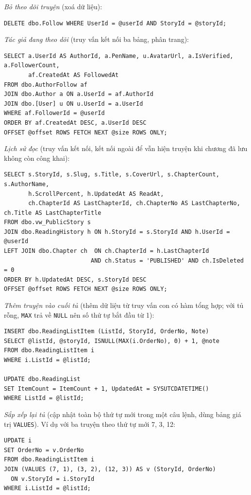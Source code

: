 \textit{Bỏ theo dõi truyện} (xoá dữ liệu):
\begin{verbatim}
DELETE dbo.Follow WHERE UserId = @userId AND StoryId = @storyId;
\end{verbatim}

\textit{Tác giả đang theo dõi} (truy vấn kết nối ba bảng, phân trang):
\begin{verbatim}
SELECT a.UserId AS AuthorId, a.PenName, u.AvatarUrl, a.IsVerified, a.FollowerCount,
       af.CreatedAt AS FollowedAt
FROM dbo.AuthorFollow af
JOIN dbo.Author a ON a.UserId = af.AuthorId
JOIN dbo.[User] u ON u.UserId = a.UserId
WHERE af.FollowerId = @userId
ORDER BY af.CreatedAt DESC, a.UserId DESC
OFFSET @offset ROWS FETCH NEXT @size ROWS ONLY;
\end{verbatim}

\textit{Lịch sử đọc} (truy vấn kết nối, kết nối ngoài để vẫn hiện truyện khi chương đã lưu không còn công khai):
\begin{verbatim}
SELECT s.StoryId, s.Slug, s.Title, s.CoverUrl, s.ChapterCount, s.AuthorName,
       h.ScrollPercent, h.UpdatedAt AS ReadAt,
       ch.ChapterId AS LastChapterId, ch.ChapterNo AS LastChapterNo, ch.Title AS LastChapterTitle
FROM dbo.vw_PublicStory s
JOIN dbo.ReadingHistory h ON h.StoryId = s.StoryId AND h.UserId = @userId
LEFT JOIN dbo.Chapter ch  ON ch.ChapterId = h.LastChapterId
                         AND ch.Status = 'PUBLISHED' AND ch.IsDeleted = 0
ORDER BY h.UpdatedAt DESC, s.StoryId DESC
OFFSET @offset ROWS FETCH NEXT @size ROWS ONLY;
\end{verbatim}

\textit{Thêm truyện vào cuối tủ} (thêm dữ liệu từ truy vấn con có hàm tổng hợp; với tủ rỗng, \texttt{MAX} trả về \texttt{NULL} nên số thứ tự bắt đầu từ 1):
\begin{verbatim}
INSERT dbo.ReadingListItem (ListId, StoryId, OrderNo, Note)
SELECT @listId, @storyId, ISNULL(MAX(i.OrderNo), 0) + 1, @note
FROM dbo.ReadingListItem i
WHERE i.ListId = @listId;

UPDATE dbo.ReadingList
SET ItemCount = ItemCount + 1, UpdatedAt = SYSUTCDATETIME()
WHERE ListId = @listId;
\end{verbatim}

\textit{Sắp xếp lại tủ} (cập nhật toàn bộ thứ tự mới trong một câu lệnh, dùng bảng giá trị \texttt{VALUES}). Ví dụ với ba truyện theo thứ tự mới 7, 3, 12:
\begin{verbatim}
UPDATE i
SET OrderNo = v.OrderNo
FROM dbo.ReadingListItem i
JOIN (VALUES (7, 1), (3, 2), (12, 3)) AS v (StoryId, OrderNo)
  ON v.StoryId = i.StoryId
WHERE i.ListId = @listId;
\end{verbatim}

